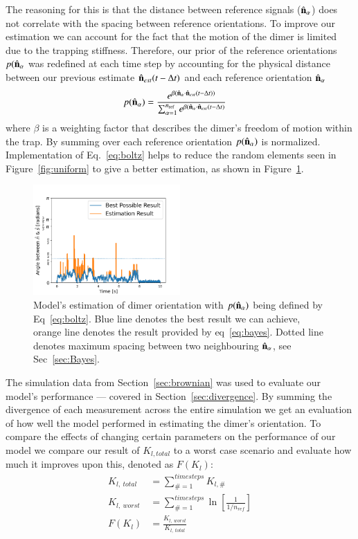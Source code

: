 \documentclass[final,  3p]{elsarticle}
\begin{document}
The reasoning for this is that the distance between reference signals ($\hat{\bf n}_\alpha$) does not correlate with the spacing between reference orientations. To improve our estimation we can account for the fact that the motion of the dimer is limited due to the trapping stiffness. Therefore, our prior of the reference orientations $p(\hat{\bf n}_\alpha$ was redefined at each time step by accounting for the physical distance between our previous estimate $\hat{\bf n}_{est}(t-\Delta t)$ and each reference orientation $\hat{\bf n}_\alpha$
\begin{align}
  p(\hat{\bf n}_\alpha)
  &=\frac{e^{\beta (\hat{\bf n}_\alpha 
  	\cdot \hat{\bf n}_{est}(t-\Delta t))}}
  {\sum_{\alpha=1}^{n_{\rm ref}}
	e^{\beta (\hat{\bf n}_\alpha 
	\cdot \hat{\bf n}_{est}(t-\Delta t)}}
	\label{eq:boltz}
\end{align}
where $\beta$ is a weighting factor that describes the dimer's freedom of motion within the trap. By summing over each reference orientation $p(\hat{\bf n}_\alpha)$ is normalized. Implementation of Eq.~\eqref{eq:boltz} helps to reduce the random elements seen in  Figure~\ref{fig:uniform} to give a better estimation, as shown in Figure~\ref{fig:biased}. 

\begin{figure}[h]
	\centering
	\includegraphics[width=0.5\textwidth]{./Images/fig4.png}
	\caption{Model's estimation of dimer orientation with $p(\hat{\bf n}_\alpha)$ being defined by Eq~\eqref{eq:boltz}. Blue line denotes the best result we can achieve, orange line denotes the result provided by eq~\ref{eq:bayes}. Dotted line denotes maximum spacing between two neighbouring $\hat{\bf n}_\alpha$, see Sec~\ref{sec:Bayes}.}
	\label{fig:biased}
\end{figure} 
 
The simulation data from Section~\ref{sec:brownian} was used to evaluate our model's performance --- covered in Section~\ref{sec:divergence}. By summing the divergence of each measurement across the entire simulation we get an evaluation of how well the model performed in estimating the dimer's orientation. To compare the effects of changing certain parameters on the performance of our model we compare our result of $K_{l,total}$ to a worst case scenario and evaluate how much it improves upon this, denoted as $F(K_l)$:
\begin{align}
K_{l, \ total} &= \sum\limits_{\# =1}^{timesteps} K_{l,\#} \\
K_{l, \ worst} &= \sum\limits_{\#=1}^{timesteps} \ln \left[\frac{1}{1/n_{ref}} \right] \\
F(K_l) &= \frac{K_{l,\ worst}}{K_{l, \ total}}
\end{align}
\end{document}
